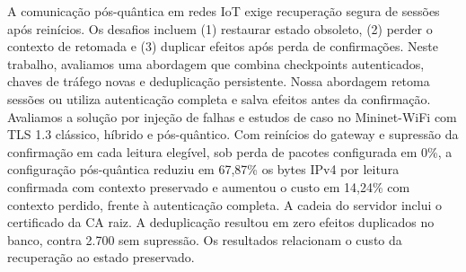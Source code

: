 \begin{abstract}
Post-quantum communication in IoT requires secure session recovery after restarts. Challenges include (1) restoring obsolete cryptographic state, (2) losing resumption context, and (3) duplicating effects after lost acknowledgements. In this work, we evaluate recovery combining authenticated checkpoints, fresh traffic keys, and persistent deduplication. Our approach resumes sessions or uses full authentication and saves effects before acknowledgement. We evaluate this through fault injection and case studies in Mininet-WiFi with classical, hybrid, and post-quantum TLS 1.3. With gateway restarts and acknowledgement suppression at every eligible reading and 0\% configured packet loss, the post-quantum configuration saves 67.87\% of IPv4 bytes per confirmed reading with preserved context and increases costs by 14.24\% with lost context, relative to full authentication. The server chain includes the root CA certificate. Deduplication yielded zero duplicate database effects, against 2,700 without suppression. These results link recovery costs to preserved state.
\end{abstract}

\begin{resumo}
A comunicação pós-quântica em redes IoT exige recuperação segura de sessões após reinícios. Os desafios incluem (1) restaurar estado obsoleto, (2) perder o contexto de retomada e (3) duplicar efeitos após perda de confirmações. Neste trabalho, avaliamos uma abordagem que combina checkpoints autenticados, chaves de tráfego novas e deduplicação persistente. Nossa abordagem retoma sessões ou utiliza autenticação completa e salva efeitos antes da confirmação. Avaliamos a solução por injeção de falhas e estudos de caso no Mininet-WiFi com TLS 1.3 clássico, híbrido e pós-quântico. Com reinícios do gateway e supressão da confirmação em cada leitura elegível, sob perda de pacotes configurada em 0\%, a configuração pós-quântica reduziu em 67,87\% os bytes IPv4 por leitura confirmada com contexto preservado e aumentou o custo em 14,24\% com contexto perdido, frente à autenticação completa. A cadeia do servidor inclui o certificado da CA raiz. A deduplicação resultou em zero efeitos duplicados no banco, contra 2.700 sem supressão. Os resultados relacionam o custo da recuperação ao estado preservado.
\end{resumo}
